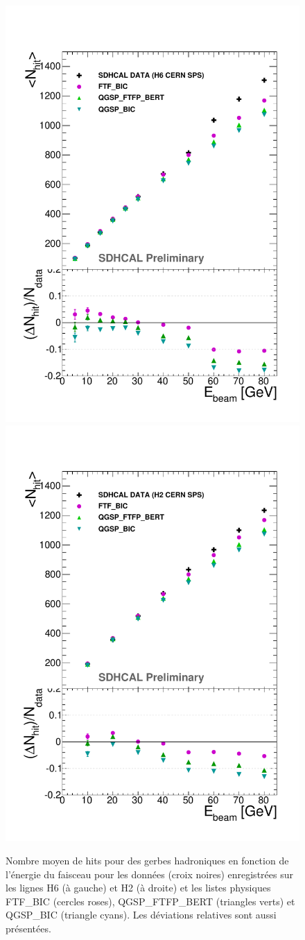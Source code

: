 \begin{figure}[!ht]
  \includegraphics[width=.5\textwidth]{Digitizer/figs/NHITPION_MODEL.pdf}
  \includegraphics[width=.5\textwidth]{Digitizer/figs/NHITPION_MODEL_NOV.pdf}
  \caption{Nombre moyen de hits pour des gerbes hadroniques en fonction de l'énergie du faisceau pour les données (croix noires) enregistrées sur les lignes H6 (à gauche) et H2 (à droite) et les listes physiques FTF\_BIC (cercles roses), QGSP\_FTFP\_BERT (triangles verts) et QGSP\_BIC (triangle cyans). Les déviations relatives sont aussi présentées.}
  \label{fig.nhit_pi-_ebeam_model}
\end{figure}
